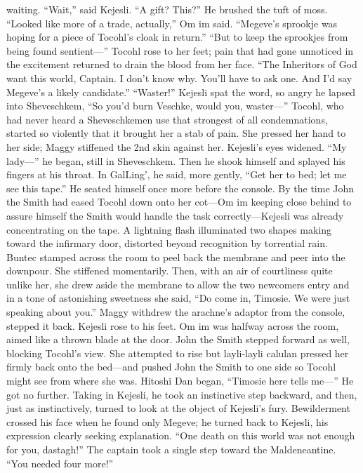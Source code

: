\documentclass[9pt]{article}
\begin{document}
waiting.
“Wait,” said Kejesli. “A gift? This?” He brushed the tuft of moss.
“Looked like more of a trade, actually,” Om im said. “Megeve’s sprookje was hoping for a piece of
Tocohl’s cloak in return.”
“But to keep the sprookjes from being found sentient—”
Tocohl rose to her feet; pain that had gone unnoticed in the excitement returned to drain the blood
from her face. “The Inheritors of God want this world, Captain. I don’t know why. You’ll have to ask
one. And I’d say Megeve’s a likely candidate.”
“Waster!” Kejesli spat the word, so angry he lapsed into Sheveschkem, “So you’d burn Veschke,
would you, waster—”
Tocohl, who had never heard a Sheveschkemen use that strongest of all condemnations, started so
violently that it brought her a stab of pain. She pressed her hand to her side; Maggy stiffened the 2nd skin
against her.
Kejesli’s eyes widened. “My lady—” he began, still in Sheveschkem. Then he shook himself and
splayed his fingers at his throat. In GalLing’, he said, more gently, “Get her to bed; let me see this tape.”
He seated himself once more before the console.
By the time John the Smith had eased Tocohl down onto her cot—Om im keeping close behind to
assure himself the Smith would handle the task correctly—Kejesli was already concentrating on the tape.
A lightning flash illuminated two shapes making toward the infirmary door, distorted beyond
recognition by torrential rain. Buntec stamped across the room to peel back the membrane and peer into
the downpour. She stiffened momentarily. Then, with an air of courtliness quite unlike her, she drew aside
the membrane to allow the two newcomers entry and in a tone of astonishing sweetness she said, “Do
come in, Timosie. We were just speaking about you.”
Maggy withdrew the arachne’s adaptor from the console, stepped it back. Kejesli rose to his feet.
Om im was halfway across the room, aimed like a thrown blade at the door. John the Smith stepped
forward as well, blocking Tocohl’s view. She attempted to rise but layli-layli calulan pressed her firmly
back onto the bed—and pushed John the Smith to one side so Tocohl might see from where she was.
Hitoshi Dan began, “Timosie here tells me—” He got no further. Taking in Kejesli, he took an
instinctive step backward, and then, just as instinctively, turned to look at the object of Kejesli’s fury.
Bewilderment crossed his face when he found only Megeve; he turned back to Kejesli, his expression
clearly seeking explanation.
“One death on this world was not enough for you, dastagh!” The captain took a single step toward
the Maldeneantine. “You needed four more!”
\end{document}
